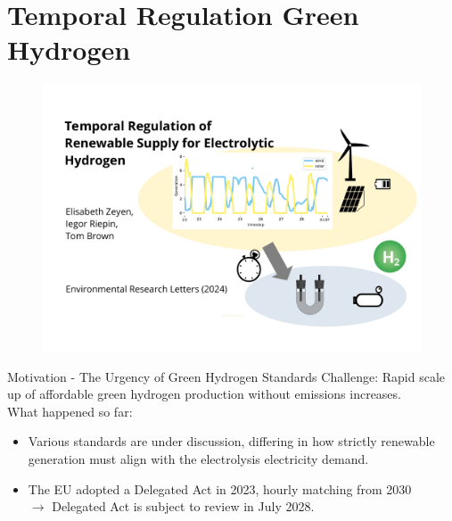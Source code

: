 \section{Temporal Regulation Green Hydrogen}
\begin{frame}
	
	\begin{figure}
		\includegraphics[trim={0cm 0cm 0cm 0cm}, width=0.9\linewidth]{images/titlepage_greenh2.pdf}
	\end{figure}
	
\end{frame}
\begin{frame}{Motivation - The Urgency of Green Hydrogen Standards}
	\alert{Challenge}: Rapid scale up of affordable green hydrogen production without emissions increases. \\
	\alert{What happened so far}:
	\begin{itemize}
		\item Various standards are under discussion, differing in how strictly renewable generation must align with the electrolysis electricity demand.
		\item The EU adopted a Delegated Act in 2023, hourly matching from 2030 
		\\ $\rightarrow$ \alert{Delegated Act} is subject to \alert{review in July 2028}.
	\end{itemize} 
\end{frame}

